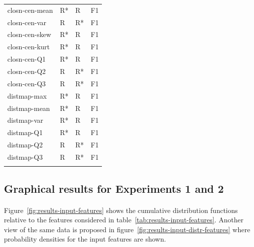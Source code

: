 \begin{longtable}{llll}
		closn-cen-mean                &     R* &    R &    F1 \\
		closn-cen-var                 &      R &   R* &    F1 \\
		closn-cen-skew                &     R* &    R &    F1 \\
		closn-cen-kurt                &     R* &    R &    F1 \\
		closn-cen-Q1                  &     R* &    R &    F1 \\
		closn-cen-Q2                  &      R &   R* &    F1 \\
		closn-cen-Q3                  &      R &   R* &    F1 \\
		distmap-max                   &     R* &    R &    F1 \\
		distmap-mean                  &     R* &    R &    F1 \\
		distmap-var                   &     R* &    R &    F1 \\
		distmap-Q1                    &     R* &    R &    F1 \\
		distmap-Q2                    &      R &   R* &    F1 \\
		distmap-Q3                    &      R &   R* &    F1 \\
		\label{tab:results-other-features}
	\end{longtable}

\subsection{Graphical results for Experiments 1 and 2}
\paragraph{} Figure~\ref{fig:results-input-features} shows the cumulative distribution functions relative to the features considered in table~\ref{tab:results-input-features}. Another view of the same data is proposed in figure~\ref{fig:results-input-distr-features} where probability densities for the input features are shown.

